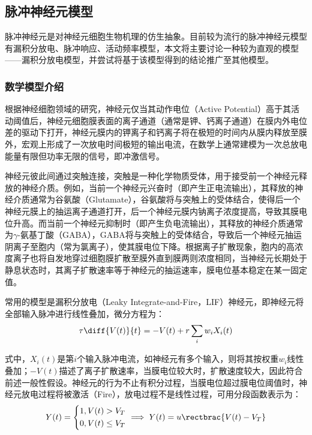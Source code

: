 \documentclass[11pt]{article}
\begin{document}
\subsection{脉冲神经元模型}
脉冲神经元是对神经元细胞生物机理的仿生抽象。目前较为流行的脉冲神经元模型有漏积分放电、脉冲响应、活动频率模型，本文将主要讨论一种较为直观的模型——漏积分放电模型，并尝试将基于该模型得到的结论推广至其他模型。
\subsubsection{数学模型介绍}
根据神经细胞领域的研究\cite{albesa-gonzalezLearningFilopodiaSpines2023}，神经元仅当其动作电位（Active Potential）高于其活动阈值后，神经元细胞膜表面的离子通道（通常是钾、钙离子通道）在膜内外电位差的驱动下打开，神经元膜内的钾离子和钙离子将在极短的时间内从膜内释放至膜外，宏观上形成了一次放电时间极短的输出电流，在数学上通常建模为一次总放电能量有限但功率无限的信号，即冲激信号。\par
神经元彼此间通过突触连接，突触是一种化学物质受体，用于接受前一个神经元释放的神经介质。例如，当前一个神经元兴奋时（即产生正电流输出），其释放的神经介质通常为谷氨酸（Glutamate），谷氨酸将与突触上的受体结合，使得后一个神经元膜上的抽运离子通道打开，后一个神经元膜内钠离子浓度提高，导致其膜电位升高。而当前一个神经元抑制时（即产生负电流输出），其释放的神经介质通常为$\gamma$-氨基丁酸（GABA），GABA将与突触上的受体结合，导致后一个神经元抽运阴离子至胞内（常为氯离子），使其膜电位下降。根据离子扩散现象，胞内的高浓度离子也将自发地穿过细胞膜扩散至膜外直到膜两则浓度相同，当神经元长期处于静息状态时，其离子扩散速率等于神经元的抽运速率，膜电位基本稳定在某一固定值。\par
常用的模型是漏积分放电（Leaky Integrate-and-Fire，LIF）神经元\cite{gerstnerTimeStructureActivity1995}，即神经元将全部输入脉冲进行线性叠加，微分方程为：
\begin{align}
  \tau\diff{V(t)}{t}=-V(t)+r\sum\limits_iw_iX_i(t)
  \label{eq:LIF积分过程}
\end{align}\par
式中，$X_i(t)$是第$i$个输入脉冲电流，如神经元有多个输入，则将其按权重$w_i$线性叠加；$-V(t)$描述了离子扩散速率，当膜电位较大时，扩散速度较大，因此符合前述一般性假设。神经元的行为不止有积分过程，当膜电位超过膜电位阈值时，神经元放电过程将被激活（Fire），放电过程不是线性过程，可用分段函数表示为：
\begin{align}
  Y(t)=\left\{\begin{aligned}
                1 & ,V(t)>V_T    \\
                0 & ,V(t)\le V_T
              \end{aligned}\right.\implies Y(t)=u\rectbrac{V(t)-V_T}
  \label{eq:LIF放电过程}
\end{align}\par
\end{document}
